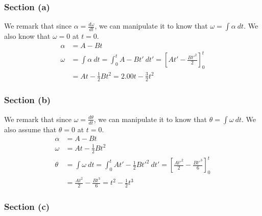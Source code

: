 \documentclass[12pt]{article}
\begin{document}
\subsubsection*{Section (a)}
We remark that since $\alpha = \frac{d\omega}{dt}$, we can manipulate it to know that $\omega = \int \alpha\ dt$. We also know that $\omega = 0$ at $t = 0$.
\begin{align*}
    \alpha  &=  A - Bt\\
    \omega  &=  \int \alpha\ dt
            =   \int_{0}^{t} A - Bt'\ dt'
            =   \left[At' - \frac{Bt'^2}{2}\right]_0^t\\
            &=  At - \frac{1}{2}Bt^2
            =   \boxed{2.00t - \frac{3}{2}t^2}
\end{align*}

\subsubsection*{Section (b)}
We remark that since $\omega = \frac{d\theta}{dt}$, we can manipulate it to know that $\theta = \int \omega\ dt$. We also assume that $\theta = 0$ at $t = 0$.
\begin{align*}
    \alpha  &=  A - Bt\\
    \omega  &=  At - \frac{1}{2}Bt^2\\
    \theta  &=  \int \omega\ dt
            =   \int_{0}^{t} At' - \frac{1}{2}Bt'^2\ dt'
            =   \left[\frac{At'^2}{2} - \frac{Bt'^3}{6}\right]_0^t\\
            &=  \frac{At^2}{2} - \frac{Bt^3}{6}
            =   \boxed{t^2 - \frac{1}{2}t^3}
\end{align*}

\subsubsection*{Section (c)}
\end{document}
